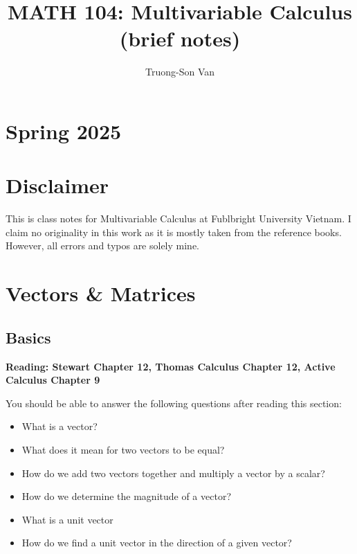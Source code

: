 \documentclass[
]{book}
\title{MATH 104: Multivariable Calculus (brief notes)}
\author{Truong-Son Van}
\date{}
\theoremstyle{definition}
\theoremstyle{definition}
\theoremstyle{definition}
\theoremstyle{definition}
\theoremstyle{remark}
\begin{document}
\maketitle

{
\setcounter{tocdepth}{2}
\tableofcontents
}
\hypertarget{spring-2025}{%
\chapter*{Spring 2025}\label{spring-2025}}

\hypertarget{disclaimer}{%
\chapter*{Disclaimer}\label{disclaimer}}


This is class notes for Multivariable Calculus at Fublbright University Vietnam.
I claim no originality in this work as it is mostly taken from the reference books.
However, all errors and typos are solely mine.

\newpage

\newcommand{\vectorproj}[2][]{\mathrm{proj}_{\vect{#1}}\vect{#2}}
\newcommand{\vectorcomp}[2][]{\mathrm{comp}_{\vect{#1}}\vect{#2}}
\newcommand{\vect}{\mathbf}
\newcommand{\R}{\mathbb{R}}

\hypertarget{vectors-matrices}{%
\chapter{Vectors \& Matrices}\label{vectors-matrices}}

\hypertarget{basics}{%
\section{Basics}\label{basics}}

\textbf{Reading: Stewart Chapter 12, Thomas Calculus Chapter 12,
Active Calculus Chapter 9}

You should be able to answer the following questions after reading this section:

\begin{itemize}
\item
  What is a vector?
\item
  What does it mean for two vectors to be equal?
\item
  How do we add two vectors together and multiply a vector by a scalar?
\item
  How do we determine the magnitude of a vector?
\item
  What is a unit vector
\item
  How do we find a unit vector in the direction of a given vector?
\end{itemize}
\end{document}
